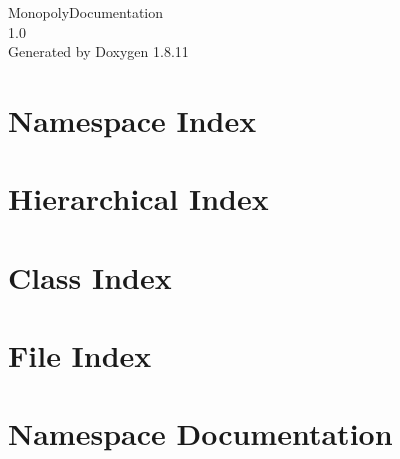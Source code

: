 \documentclass[twoside]{book}
\newcommand{\+}{\discretionary{\mbox{\scriptsize$\hookleftarrow$}}{}{}}
\newcommand{\clearemptydoublepage}{%
  \newpage{\pagestyle{empty}\cleardoublepage}%
}
\begin{document}
\hypersetup{pageanchor=false,
             bookmarksnumbered=true,
             pdfencoding=unicode
            }
\begin{titlepage}
\vspace*{7cm}
\begin{center}%
{\Large Monopoly\+Documentation \\[1ex]\large 1.\+0 }\\
\vspace*{1cm}
{\large Generated by Doxygen 1.8.11}\\
\end{center}
\end{titlepage}
\clearemptydoublepage
\tableofcontents
\clearemptydoublepage
{}
\hypersetup{pageanchor=true}

\chapter{Namespace Index}

\chapter{Hierarchical Index}

\chapter{Class Index}

\chapter{File Index}

\chapter{Namespace Documentation}





\end{document}
